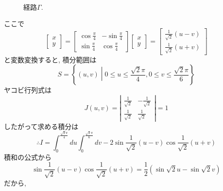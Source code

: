 \documentclass[a4paper,10pt,report]{amsart}
\theoremstyle{plain}
\theoremstyle{definition}
\theoremstyle{remark}
\begin{document}
\begin{enumerate}
\begin{figure}[tbh]
            \caption{経路\(\Gamma\). }
        \end{figure}
        ここで
        \begin{equation*}
            \begin{bmatrix}
                x\\
                y
            \end{bmatrix}
            =\begin{bmatrix}
                \cos{\frac{\pi}{4}} & -\sin{\frac{\pi}{4}}\\
                \sin{\frac{\pi}{4}} & \cos{\frac{\pi}{4}}
            \end{bmatrix}
            \begin{bmatrix}
                x\\
                y
            \end{bmatrix}
            =\begin{bmatrix}
                \frac{1}{\sqrt{2}}(u-v)\\
                \frac{1}{\sqrt{2}}(u+v)
            \end{bmatrix}
        \end{equation*}
        と変数変換すると, 積分範囲は
        \begin{equation*}
            S=\left \{(u,v)\middle| 0\leq u\leq\frac{\sqrt{2}\pi}{4},0\leq v\leq \frac{\sqrt{2}\pi}{6}\right \}
        \end{equation*}
        ヤコビ行列式は
        \begin{equation*}
            J(u,v)=\left|\begin{array}{cc}
                \frac{1}{\sqrt{2}} & -\frac{1}{\sqrt{2}}\\
                \frac{1}{\sqrt{2}} & \frac{1}{\sqrt{2}}
            \end{array}\right|=1
        \end{equation*}
        したがって求める積分は
        \begin{equation*}
            \therefore I=\int_{0}^{\frac{\sqrt{2}\pi}{4}}du\int_{0}^{\frac{\sqrt{2}\pi}{6}}dv-2\sin{\frac{1}{\sqrt{2}}(u-v)}\cos{\frac{1}{\sqrt{2}}(u+v)}
        \end{equation*}
        積和の公式から
        \begin{equation*}
            \sin{\frac{1}{\sqrt{2}}(u-v)}\cos{\frac{1}{\sqrt{2}}(u+v)}=\frac{1}{2}(\sin{\sqrt{2}u}-\sin{\sqrt{2}v})
        \end{equation*}
        だから,
        \begin{equation*}

\end{equation*}
\end{enumerate}
\end{document}
